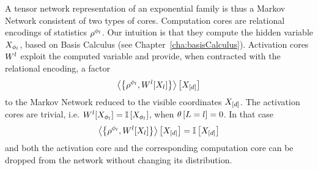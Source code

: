 A tensor network representation of an exponential family is thus a Markov Network consistent of two types of cores.
Computation cores are relational encodings of statistics $\rho^{\phi_{l}}$.
Our intuition is that they compute the hidden variable $X_{\phi_{l}}$, based on Basis Calculus (see Chapter~\ref{cha:basisCalculus}).
Activation cores $W^{l}$ exploit the computed variable and provide, when contracted with the relational encoding, a factor 
	\[ \left\langle \left\{\rho^{\phi_{l}}, W^{l}[X_{l}]\right\}\right\rangle \left[ X_{[d]} \right]  \]
to the Markov Network reduced to the visible coordinates $X_{[d]}$.
The activation cores are trivial, i.e. $W^{l}[X_{\phi_{l}}]=\mathbb{I}\left[X_{\phi_{l}}\right]$, when $\theta\left[L=l\right]=0$.
In that case 
	\[  \left\langle \left\{\rho^{\phi_{l}}, W^{l}[X_{l}]\right\}\right\rangle \left[ X_{[d]} \right] 
	= \mathbb{I}\left[X_{[d]}\right] \]
and both the activation core and the corresponding computation core can be dropped from the network without changing its distribution.

%
%	


